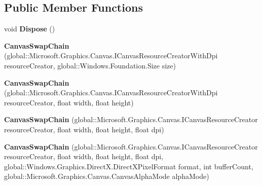\subsection*{Public Member Functions}
\begin{DoxyCompactItemize}
\item 
\mbox{\label{class_microsoft_1_1_graphics_1_1_canvas_1_1_canvas_swap_chain_aa07ba3151a28bffab0828ea35cbe8aff}} 
void {\bfseries Dispose} ()
\item 
\mbox{\label{class_microsoft_1_1_graphics_1_1_canvas_1_1_canvas_swap_chain_a4c0dc1805f7d1ee90d0aaa3d685cce75}} 
{\bfseries Canvas\+Swap\+Chain} (global\+::\+Microsoft.\+Graphics.\+Canvas.\+I\+Canvas\+Resource\+Creator\+With\+Dpi resource\+Creator, global\+::\+Windows.\+Foundation.\+Size size)
\item 
\mbox{\label{class_microsoft_1_1_graphics_1_1_canvas_1_1_canvas_swap_chain_a26637921bfc09432963a1a68273083d5}} 
{\bfseries Canvas\+Swap\+Chain} (global\+::\+Microsoft.\+Graphics.\+Canvas.\+I\+Canvas\+Resource\+Creator\+With\+Dpi resource\+Creator, float width, float height)
\item 
\mbox{\label{class_microsoft_1_1_graphics_1_1_canvas_1_1_canvas_swap_chain_aaafc853ef669866291a8d037e900b55f}} 
{\bfseries Canvas\+Swap\+Chain} (global\+::\+Microsoft.\+Graphics.\+Canvas.\+I\+Canvas\+Resource\+Creator resource\+Creator, float width, float height, float dpi)
\item 
\mbox{\label{class_microsoft_1_1_graphics_1_1_canvas_1_1_canvas_swap_chain_a06c8c4d3a0f23349f3487a07eea4e047}} 
{\bfseries Canvas\+Swap\+Chain} (global\+::\+Microsoft.\+Graphics.\+Canvas.\+I\+Canvas\+Resource\+Creator resource\+Creator, float width, float height, float dpi, global\+::\+Windows.\+Graphics.\+Direct\+X.\+Direct\+X\+Pixel\+Format format, int buffer\+Count, global\+::\+Microsoft.\+Graphics.\+Canvas.\+Canvas\+Alpha\+Mode alpha\+Mode)
\item 
\mbox{\label{class_microsoft_1_1_graphics_1_1_canvas_1_1_canvas_swap_chain_a8dfcb6a20dfa7505601d2376461eb5c4}} 

\end{DoxyCompactItemize}
